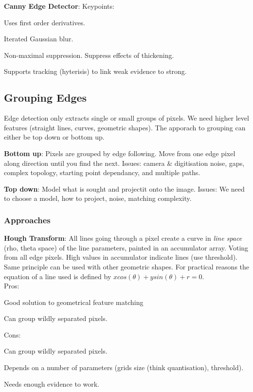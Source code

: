 \documentclass[8pt]{extarticle}
\begin{document}
\begin{multicols}{2}
\textbf{Canny Edge Detector}: Keypoints:
    \begin{compactitem}
        \item Uses first order derivatives.
        \item Iterated Gaussian blur.
        \item Non-maximal suppression. Suppress effects of thickening.
        \item Supports tracking (hyterisis) to link weak evidence to strong.
    \end{compactitem}

\subsection{Grouping Edges}
Edge detection only extracts single or small groups of pixels. We need higher level features (straight lines, curves, geometric shapes). The apporach to grouping can either be top down or bottom up.

\begin{compactitem}
    \item \textbf{Bottom up}: Pixels are grouped by edge following. Move from one edge pixel along direction until you find the next. Issues: camera \& digitisation noise, gaps, complex topology, starting point dependancy, and multiple paths.

    \item \textbf{Top down}: Model what is sought and projectit onto the image. Issues: We need to choose a model, how to project, noise, matching complexity.
\end{compactitem}

\subsubsection{Approaches}

\textbf{Hough Transform}: All lines going through a pixel create a curve in \textit{line space} (rho, theta space) of the line parameters, painted in an accumulator array. Voting from all edge pixels. High values in accumulator indicate lines (use threshold). Same principle can be used with other geometric shapes. For practical reasons the equation of a line used is defined by $x cos(\theta) + y sin(\theta) + r = 0$.\\
Pros:
\begin{compactitem}
    \item Good solution to geometrical feature matching
    \item Can group wildly separated pixels.
\end{compactitem}
Cons:
\begin{compactitem}
    \item Can group wildly separated pixels.
    \item Depends on a number of parameters (grids size (think quantisation), threshold).
    \item Needs enough evidence to work.
\end{compactitem}


\end{multicols}
\end{document}
